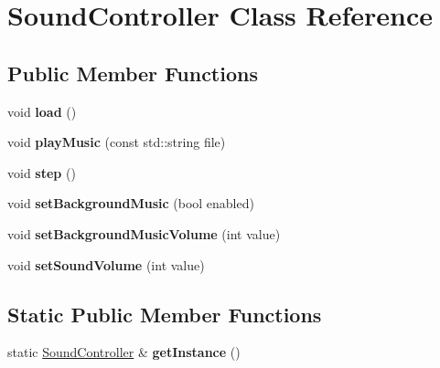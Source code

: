 \hypertarget{class_sound_controller}{\section{Sound\+Controller Class Reference}
\label{class_sound_controller}
}
\subsection*{Public Member Functions}
\begin{DoxyCompactItemize}
\item 
\hypertarget{class_sound_controller_a6fe6f4192a2664969c9b71616060e440}{void {\bfseries load} ()}\label{class_sound_controller_a6fe6f4192a2664969c9b71616060e440}

\item 
\hypertarget{class_sound_controller_aa13c7b3735163a1f4c259c9d357ec510}{void {\bfseries play\+Music} (const std\+::string file)}\label{class_sound_controller_aa13c7b3735163a1f4c259c9d357ec510}

\item 
\hypertarget{class_sound_controller_a9815a4b5aa7df20c7780e66fd86a8e54}{void {\bfseries step} ()}\label{class_sound_controller_a9815a4b5aa7df20c7780e66fd86a8e54}

\item 
\hypertarget{class_sound_controller_ad9640d15b2e9b32829d051b59ae5de9d}{void {\bfseries set\+Background\+Music} (bool enabled)}\label{class_sound_controller_ad9640d15b2e9b32829d051b59ae5de9d}

\item 
\hypertarget{class_sound_controller_a7df7bc23543a4567aae652b064b19c73}{void {\bfseries set\+Background\+Music\+Volume} (int value)}\label{class_sound_controller_a7df7bc23543a4567aae652b064b19c73}

\item 
\hypertarget{class_sound_controller_ac2553758c376ca9e2b38f0f1a071bba7}{void {\bfseries set\+Sound\+Volume} (int value)}\label{class_sound_controller_ac2553758c376ca9e2b38f0f1a071bba7}

\end{DoxyCompactItemize}
\subsection*{Static Public Member Functions}
\begin{DoxyCompactItemize}
\item 
\hypertarget{class_sound_controller_a167ca29530994a8483b090ff044ee49a}{static \hyperlink{class_sound_controller}{Sound\+Controller} \& {\bfseries get\+Instance} ()}\label{class_sound_controller_a167ca29530994a8483b090ff044ee49a}

\end{DoxyCompactItemize}
